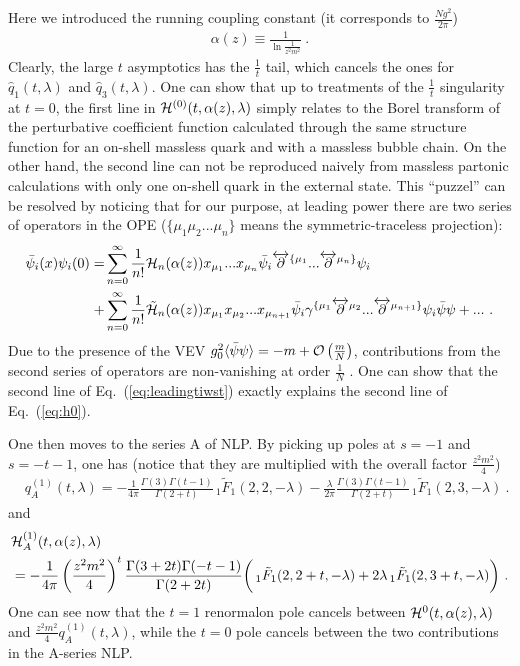 \documentclass[a4paper,11pt]{article}
\begin{document}
Here we introduced the running coupling constant (it corresponds to $\frac{N g^2}{2\pi}$)
\begin{align}
\alpha(z) \equiv \frac{1}{\ln \frac{1}{z^2m^2}} \ .
\end{align}
Clearly, the large $t$ asymptotics has the $\frac{1}{t}$ tail, which cancels the ones for $\hat q_1(t,\lambda)$ and $\hat q_3(t,\lambda)$. One can show that up to treatments of the $\frac{1}{t}$ singularity at $t=0$, the first line in ${\cal H}^{(0)}(t,\alpha(z),\lambda)$ simply relates to the Borel transform of the perturbative coefficient function calculated through the same structure function for an on-shell massless quark and with a massless bubble chain. On the other hand, the second line can not be reproduced naively from massless partonic calculations with only one on-shell quark in the external state. This ``puzzel'' can be resolved by noticing that for our purpose, at leading power there are two series of operators in the OPE ($\{\mu_1\mu_2...\mu_n\}$ means the symmetric-traceless projection):
\begin{align}\label{eq:leadingtiwst}
\bar \psi_i(x)\psi_i(0)=&\sum_{n=0}^{\infty}\frac{1}{n!} {\cal H}_n(\alpha(z))x_{\mu_1}...x_{\mu_n}\bar\psi_i \overleftrightarrow{\partial}^{\{\mu_1}...\overleftrightarrow{\partial}^{\mu_n\}}\psi_i \nonumber \\ 
+&\sum_{n=0}^{\infty}\frac{1}{n!}\tilde {\cal H}_n(\alpha(z))x_{\mu_1}x_{\mu_2}...x_{\mu_{n+1}}\bar\psi_i \gamma^{\{\mu_1} \overleftrightarrow{\partial}^{\mu_2}...\overleftrightarrow{\partial}^{\mu_{n+1}\}}\psi_i \bar \psi\psi+... \ . 
\end{align}
Due to the presence of the VEV $g_0^2\langle \bar \psi \psi\rangle=-m+{\cal O}\left(\frac{m}{N}\right)$, contributions from the second series of operators are non-vanishing at order $\frac{1}{N}$ . One can show that the second line of Eq.~(\ref{eq:leadingtiwst}) exactly explains the second line of Eq.~(\ref{eq:h0}). 

One then moves to the series A of NLP. By picking up poles at $s=-1$ and $s=-t-1$, one has (notice that they are multiplied with the overall factor $\frac{z^2m^2}{4}$)
\begin{align}
&q^{(1)}_A(t,\lambda)=-\frac{1}{4\pi}\frac{\Gamma(3)\Gamma(t-1)}{\Gamma(2+t)}\,_1\tilde F_1(2,2,-\lambda) -\frac{\lambda}{2\pi}\frac{\Gamma(3)\Gamma(t-1)}{\Gamma(2+t)}\,_1\tilde F_1(2,3,-\lambda)\ . \label{eq:qA}
\end{align}
and
\begin{align}
&{\cal H}^{(1)}_A(t,\alpha(z),\lambda)\nonumber \\ &=-\frac{1}{4\pi}\left(\frac{z^2m^2}{4}\right)^{t}\frac{\Gamma(3+2t)\Gamma(-t-1)}{\Gamma(2+2t)}\bigg(\,_1\tilde F_1(2,2+t,-\lambda) +2\lambda \,_1\tilde F_1(2,3+t,-\lambda) \bigg) \label{eq:ha}  \ . 
\end{align}
One can see now that the $t=1$ renormalon pole cancels between ${\cal H}^{0}(t, \alpha(z),\lambda)$ and $\frac{z^2m^2}{4}q^{(1)}_A(t,\lambda)$, while the $t=0$ pole cancels between the two contributions in the A-series NLP. 
\end{document}
